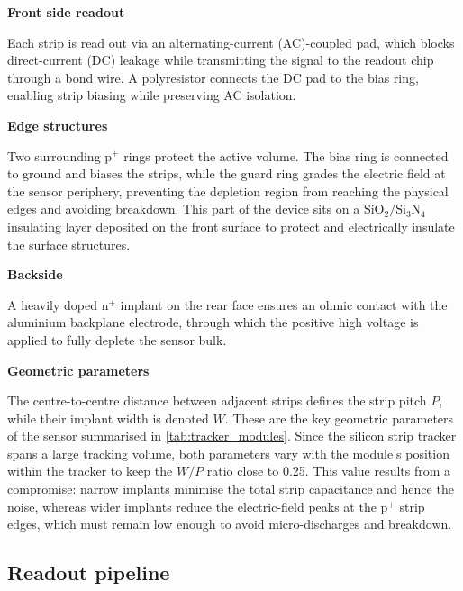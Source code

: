 \vspace{0.5 cm}
\noindent\textbf{Front side readout}
\vspace{0.5 cm}

Each strip is read out via an alternating-current (AC)-coupled pad, which blocks direct-current (DC) leakage while transmitting the signal to the readout chip through a bond wire. A polyresistor connects the DC pad to the bias ring, enabling strip biasing while preserving AC isolation.

\vspace{0.5 cm}
\noindent\textbf{Edge structures}
\vspace{0.5 cm}

Two surrounding $\mathrm{p^+}$ rings protect the active volume. The bias ring is connected to ground and biases the strips, while the guard ring grades the electric field at the sensor periphery, preventing the depletion region from reaching the physical edges and avoiding breakdown. This part of the device sits on a $\mathrm{SiO_2/Si_3N_4}$ insulating layer deposited on the front surface to protect and electrically insulate the surface structures.

\vspace{0.5 cm}
\noindent\textbf{Backside}
\vspace{0.5 cm}

A heavily doped $\mathrm{n^+}$ implant on the rear face ensures an ohmic contact with the aluminium backplane electrode, through which the positive high voltage is applied to fully deplete the sensor bulk.

\vspace{0.5 cm}
\noindent\textbf{Geometric parameters}
\vspace{0.5 cm}

The centre-to-centre distance between adjacent strips defines the strip pitch $P$, while their implant width is denoted $W$. These are the key geometric parameters of the sensor summarised in \cref{tab:tracker_modules}. Since the silicon strip tracker spans a large tracking volume, both parameters vary with the module's position within the tracker to keep the $W/P$ ratio close to 0.25. This value results from a compromise: narrow implants minimise the total strip capacitance and hence the noise, whereas wider implants reduce the electric-field peaks at the $\mathrm{p^+}$ strip edges, which must remain low enough to avoid micro-discharges and breakdown.



\subsection{Readout pipeline}
\label{subsec:readoutpipeline}

